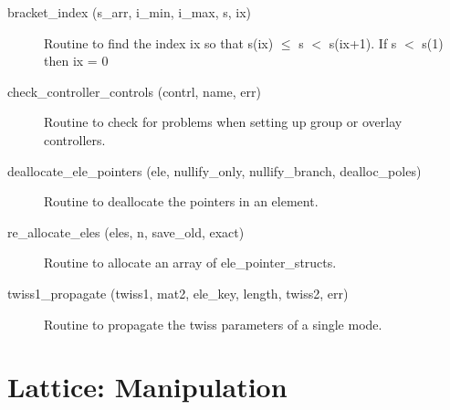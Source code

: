 \begin{description}

\label{r:bracket.index}
\item[bracket_index (s_arr, i_min, i_max, s, ix)] \Newline
Routine to find the index ix so that s(ix) $\le$ s $<$ s(ix+1). 
If s $<$ s(1) then ix = 0 

\label{r:check.controller.controls}
\item[check_controller_controls (contrl, name, err)] \Newline 
Routine to check for problems when setting up group or overlay controllers.

\label{r:deallocate.ele.pointers}
\item[deallocate_ele_pointers (ele, nullify_only, nullify_branch, dealloc_poles)] \Newline
Routine to deallocate the pointers in an element. 

\label{r:re.allocate.eles}
\item[re_allocate_eles (eles, n, save_old, exact)] \Newline 
Routine to allocate an array of ele_pointer_structs.

\label{r:twiss1.propagate}
\item[twiss1_propagate (twiss1, mat2, ele_key, length, twiss2, err)] \Newline 
Routine to propagate the twiss parameters of a single mode.

\end{description}

\section{Lattice: Manipulation}
\label{r:trans}    

